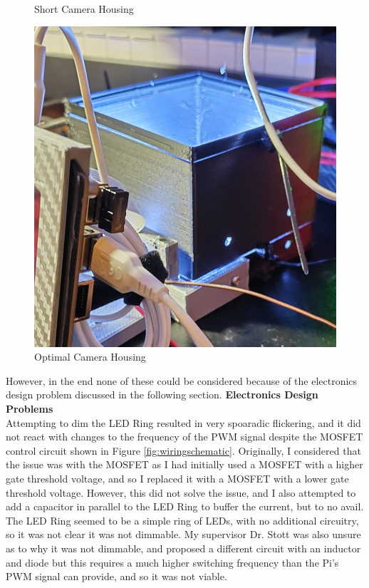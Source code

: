 \begin{figure}[t]
\begin{minipage}[t]{0.24\textwidth}
    \caption{Short Camera Housing}
    \label{fig:shortcamera}
  \end{minipage}
  \hfill
  \begin{minipage}[t]{0.24\textwidth}
    \centering
    \includegraphics[width=\textwidth]{imgs/design/tallcamera.jpeg}
    \caption{Optimal Camera Housing}
    \label{fig:tallcamera}
  \end{minipage}
\end{figure}

However, in the end none of these could be considered because of the electronics design problem discussed in the following section.
\noindent
\textbf{Electronics Design Problems} \\
Attempting to dim the LED Ring resulted in very spoaradic flickering, and it did not react with changes to the frequency of the PWM signal despite the MOSFET control circuit shown in Figure \ref*{fig:wiringschematic}.
Originally, I considered that the issue was with the MOSFET as I had initially used a MOSFET with a higher gate threshold voltage, and so I replaced it with a MOSFET with a lower gate threshold voltage.
However, this did not solve the issue, and I also attempted to add a capacitor in parallel to the LED Ring to buffer the current, but to no avail.
The LED Ring seemed to be a simple ring of LEDs, with no additional circuitry, so it was not clear it was not dimmable.
My supervisor Dr. Stott was also unsure as to why it was not dimmable, and proposed a different circuit with an inductor and diode but this requires
a much higher switching frequency than the Pi's PWM signal can provide, and so it was not viable. 

